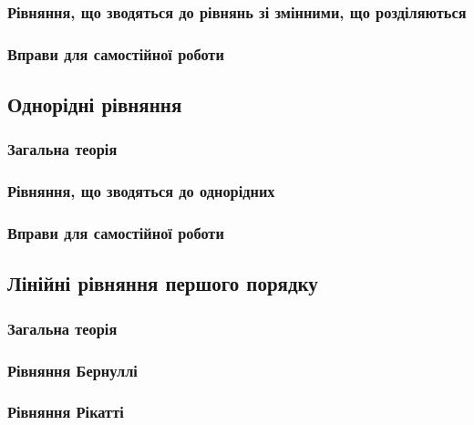 		\subsubsection{Рівняння, що зводяться до рівнянь зі змінними, що розділяються}
		

		\subsubsection{Вправи для самостійної роботи}
		

	\subsection{Однорідні рівняння}
	

		\subsubsection{Загальна теорія}
		

		\subsubsection{Рівняння, що зводяться до однорідних}
		

		\subsubsection{Вправи для самостійної роботи}
		

	\subsection{Лінійні рівняння першого порядку}
	

		\subsubsection{Загальна теорія}
		

		\subsubsection{Рівняння Бернуллі}
		

		\subsubsection{Рівняння Рікатті}
		

